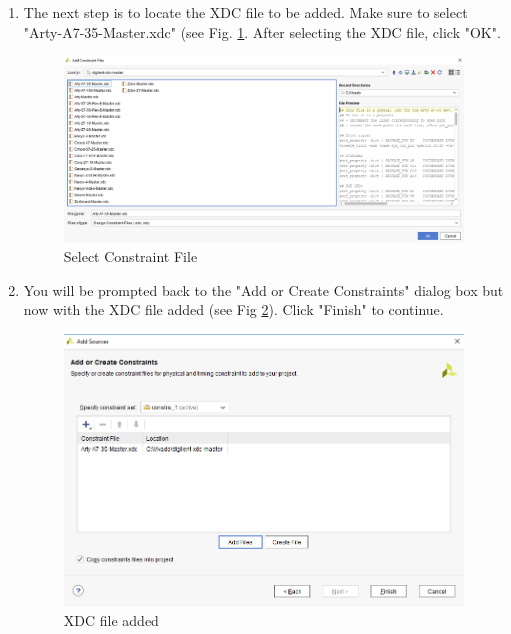 \documentclass{article}
\begin{document}
\begin{enumerate}
    \item The next step is to locate the XDC file to be added. Make sure to select "Arty-A7-35-Master.xdc" (see Fig. \ref{fig:9-locate_artyA7xdc}. 
    After selecting the XDC file, click "OK".
      \begin{figure}[h!]
        \centering
        \includegraphics[width=\linewidth]{img/program/9-locate_artyA7xdc.png}
        \caption{Select Constraint File}
        \label{fig:9-locate_artyA7xdc}
      \end{figure}

    \item You will be prompted back to the "Add or Create Constraints" dialog box but now with the XDC file added (see Fig \ref{fig:10-add_constraint_done}). 
    Click "Finish" to continue.
      \begin{figure}[h!]
        \centering
        \includegraphics[width=0.5\linewidth]{img/program/10-add_constraint_done.png}
        \caption{XDC file added}
        \label{fig:10-add_constraint_done}
      \end{figure}


\end{enumerate}
\end{document}

